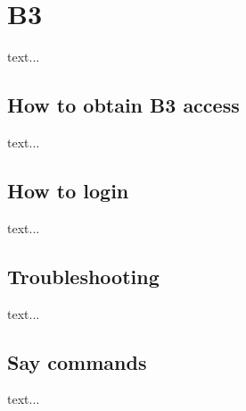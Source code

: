 \chapter{B3}
text...

\section{How to obtain B3 access}
\label{b3:obtain}
text...

\section{How to login}
\label{b3:login}
text...

\section{Troubleshooting}
\label{b3:troubleshooting}
text...

\section{Say commands}
\label{b3:say}
text...